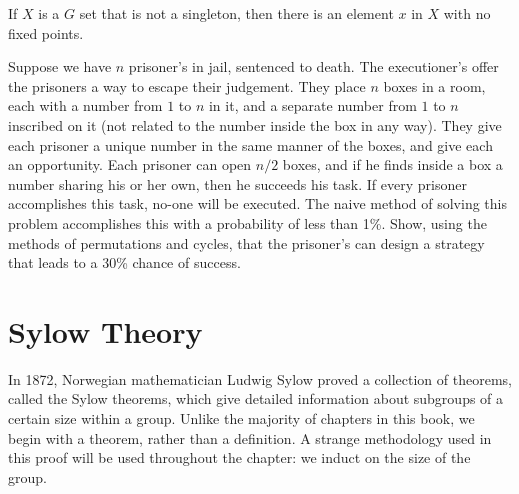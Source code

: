\begin{exercise}
    If $X$ is a $G$ set that is not a singleton, then there is an element $x$ in $X$ with no fixed points.
\end{exercise}

\begin{exercise}
    Suppose we have $n$ prisoner's in jail, sentenced to death. The executioner's offer the prisoners a way to escape their judgement. They place $n$ boxes in a room, each with a number from $1$ to $n$ in it, and a separate number from $1$ to $n$ inscribed on it (not related to the number inside the box in any way). They give each prisoner a unique number in the same manner of the boxes, and give each an opportunity. Each prisoner can open $n/2$ boxes, and if he finds inside a box a number sharing his or her own, then he succeeds his task. If every prisoner accomplishes this task, no-one will be executed. The naive method of solving this problem accomplishes this with a probability of less than 1\%. Show, using the methods of permutations and cycles, that the prisoner's can design a strategy that leads to a 30\% chance of success.
\end{exercise}





\chapter{Sylow Theory}

In 1872, Norwegian mathematician Ludwig Sylow proved a collection of theorems, called the Sylow theorems, which give detailed information about subgroups of a certain size within a group. Unlike the majority of chapters in this book, we begin with a theorem, rather than a definition. A strange methodology used in this proof will be used throughout the chapter: we induct on the size of the group.

